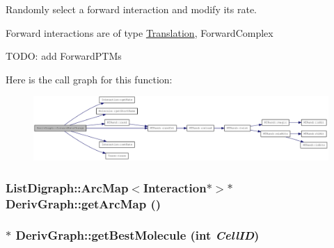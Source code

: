 Randomly select a forward interaction and modify its rate.

Forward interactions are of type \hyperlink{classTranslation}{Translation}, ForwardComplex

TODO: add ForwardPTMs 

Here is the call graph for this function:\nopagebreak
\begin{figure}[H]
\begin{center}
\leavevmode
\includegraphics[width=420pt]{classDerivGraph_afbda567a3f51d05fad37eb46fc121a89_cgraph}
\end{center}
\end{figure}
\hypertarget{classDerivGraph_a5ff2dac34f1cdcc4b4abfc26f13da1ab}{
\subsubsection[{getArcMap}]{\setlength{\rightskip}{0pt plus 5cm}ListDigraph::ArcMap$<${\bf Interaction}$\ast$$>$$\ast$ DerivGraph::getArcMap ()}}
\label{classDerivGraph_a5ff2dac34f1cdcc4b4abfc26f13da1ab}
\hypertarget{classDerivGraph_aaaa9598e55cbd8c55585a0488e940516}{
\subsubsection[{getBestMolecule}]{ $\ast$ DerivGraph::getBestMolecule (int {\em CellID})}}
\label{classDerivGraph_aaaa9598e55cbd8c55585a0488e940516}



